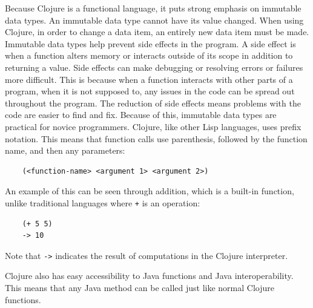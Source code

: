 \documentclass[12pt]{article}
\newcommand{\comment}[1]{{\bf \tt  {#1}}}
\newcommand{\emcomment}[1]{\textcolor{ForestGreen}{\comment{Elena: {#1}}}}
\newcommand{\hfcomment}[1]{\textcolor{Teal}{\comment{Henry: {#1}}}}
\begin{document}
Because Clojure is a functional language, it puts strong emphasis on
immutable data types. An immutable data type cannot have its value
changed. %
When using Clojure, in order to change a data item, an entirely 
new data item must be made. Immutable data types help prevent side effects in the 
program. 
A side effect is when a function alters memory or interacts outside of its scope in 
addition to 
returning a value. Side effects can make debugging or resolving errors or failures more
difficult. This is because when a function interacts with other parts of a program,
when it is not supposed to, any issues in the code can be spread out throughout the 
program. The
reduction of side effects means problems with the code are easier to find and fix.
Because of this, immutable data types are practical for novice programmers.
Clojure, like other Lisp languages, uses prefix notation. This means
that function calls use parenthesis, followed by the function name,
and then any parameters: 
\begin{verbatim}
	(<function-name> <argument 1> <argument 2>)
\end{verbatim}

An example of this can be seen through addition, which is a built-in function, unlike 
traditional
languages where \texttt{+} is an operation: %

\begin{verbatim}
	(+ 5 5)
	-> 10
\end{verbatim}

Note that \texttt{->} indicates the result of computations in the Clojure interpreter.

Clojure also has easy accessibility to Java functions and Java
interoperability. This means that any Java method can be called just
like normal Clojure functions.
\end{document}
